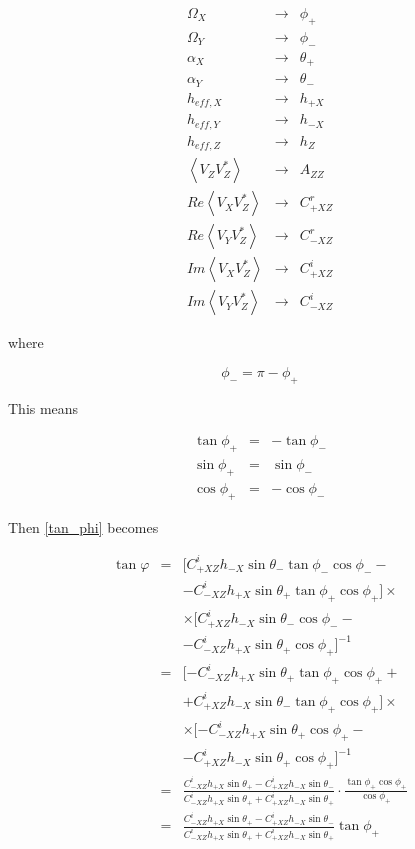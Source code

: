 \documentclass[a4paper,14pt]{extbook}
\begin{document}
\begin{eqnarray}
  \Omega_X &\rightarrow& \phi_+ \\
\Omega_Y &\rightarrow& \phi_- \\
\alpha_X &\rightarrow& \theta_+ \\
\alpha_Y &\rightarrow& \theta_-\\
h_{eff,X} &\rightarrow& h_{+X} \\
h_{eff,Y} &\rightarrow& h_{-X}\\
h_{eff,Z} &\rightarrow& h_{Z}\\
\left\langle V_Z V_Z^{*} \right\rangle &\rightarrow& A_{ZZ}\\
Re \left\langle V_X V_Z^{*} \right\rangle &\rightarrow& C_{+XZ}^r\\
Re \left\langle V_Y V_Z^{*}\right\rangle &\rightarrow& C_{-XZ}^r\\
Im \left\langle V_X V_Z^{*} \right\rangle &\rightarrow& C_{+XZ}^i\\
Im \left\langle V_Y V_Z^{*}\right\rangle &\rightarrow& C_{-XZ}^i
\end{eqnarray}

where

\begin{equation}
    \phi_-=\pi -\phi_+
\end{equation}

This means

\begin{eqnarray}
 \tan \phi_+ &=& - \tan \phi_- \\
 \sin \phi_+ &=&  \sin \phi_- \\
 \cos \phi_+ &=& - \cos \phi_-
\end{eqnarray}

Then \ref{tan_phi} becomes

\begin{eqnarray}\label{tan_phi_cecconi}
\tan \varphi &=& [C_{+XZ}^i h_{-X} \sin \theta_- \tan \phi_- \cos \phi_- -\\
&&-C_{-XZ}^i h_{+X} \sin \theta_+ \tan \phi_+ \cos \phi_+] \times \nonumber \\
&&\times[C_{+XZ}^i h_{-X} \sin \theta_- \cos \phi_- -\nonumber \\
&&-  C_{-XZ}^i h_{+X} \sin \theta_+  \cos \phi_+]^{-1}\nonumber\\
&=& [-C_{-XZ}^i h_{+X} \sin \theta_+ \tan \phi_+ \cos \phi_+ +\\
&& + C_{+XZ}^i h_{-X} \sin \theta_- \tan \phi_+ \cos \phi_+] \times \nonumber \\
&&\times [- C_{-XZ}^i h_{+X} \sin \theta_+  \cos \phi_+ - \nonumber \\
&& -  C_{+XZ}^i h_{-X} \sin \theta_+ \cos \phi_+]^{-1}\nonumber\\
&=& \frac{C_{-XZ}^i h_{+X} \sin \theta_+ - C_{+XZ}^i h_{-X} \sin \theta_-}{C_{-XZ}^i h_{+X} \sin \theta_+ + C_{+XZ}^i h_{-X} \sin \theta_+} \cdot \frac{\tan \phi_+ \cos \phi_+}{\cos \phi_+}\\
&=& \frac{C_{-XZ}^i h_{+X} \sin \theta_+ - C_{+XZ}^i h_{-X} \sin \theta_-}{C_{-XZ}^i h_{+X} \sin \theta_+ + C_{+XZ}^i h_{-X} \sin \theta_+}\tan \phi_+
\end{eqnarray}
\end{document}
